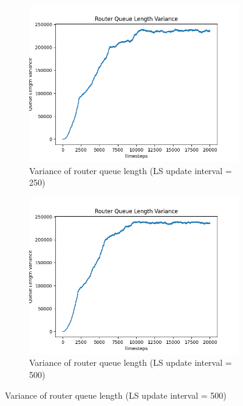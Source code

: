     \begin{figure}[H]\ContinuedFloat
        \centering
        \begin{subfigure}[b]{0.475\textwidth}
            \centering
            \includegraphics[width=\textwidth]{figs/appendix/variance_ls=250.png}
            \caption[]{Variance of router queue length (LS update interval = 250)}
            \label{fig:qvar-250}
        \end{subfigure}
        \hfill
        \begin{subfigure}[b]{0.475\textwidth}
            \centering
            \includegraphics[width=\textwidth]{figs/appendix/variance_ls=500.png}
            \caption[]{Variance of router queue length (LS update interval = 500)}
            \label{fig:qvar-500}
        \end{subfigure}
    \end{figure}
